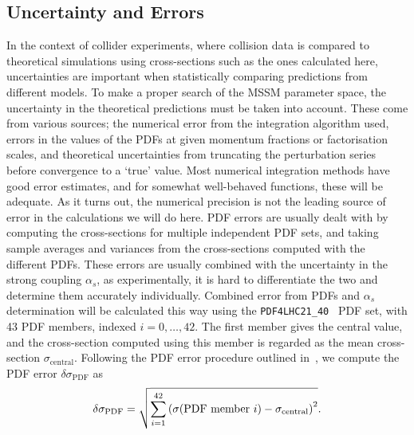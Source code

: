 \documentclass[../main.tex]{subfiles}
\begin{document}
\subsection{Uncertainty and Errors}
In the context of collider experiments, where collision data is compared to theoretical simulations using cross-sections such as the ones calculated here, uncertainties are important when statistically comparing predictions from different models.
To make a proper search of the MSSM parameter space, the uncertainty in the theoretical predictions must be taken into account.
These come from various sources; the numerical error from the integration algorithm used, errors in the values of the PDFs at given momentum fractions or factorisation scales, and theoretical uncertainties from truncating the perturbation series before convergence to a `true' value.
Most numerical integration methods have good error estimates, and for somewhat well-behaved functions, these will be adequate.
As it turns out, the numerical precision is not the leading source of error in the calculations we will do here.
PDF errors are usually dealt with by computing the cross-sections for multiple independent PDF sets, and taking sample averages and variances from the cross-sections computed with the different PDFs.
These errors are usually combined with the uncertainty in the strong coupling \(\alpha_s\), as experimentally, it is hard to differentiate the two and determine them accurately individually.
Combined error from PDFs and \(\alpha_s\) determination will be calculated this way using the \verb|PDF4LHC21_40|~\cite{PDF4LHCWorkingGroup:2022cjn} PDF set, with 43 PDF members, indexed \(i = 0, \ldots, 42\).
The first member gives the central value, and the cross-section computed using this member is regarded as the mean cross-section \(\sigma_\text{central}\).
Following the PDF error procedure outlined in~\cite{PDF4LHCWorkingGroup:2022cjn}, we compute the PDF error \(\delta \sigma_\text{PDF}\) as
\begin{equation}
  \delta\sigma_\text{PDF} = \sqrt{\sum_{i=1}^{42} \left(\sigma(\text{PDF member }i) - \sigma_\text{central}\right)^2}.
\end{equation}
\medskip
\end{document}
